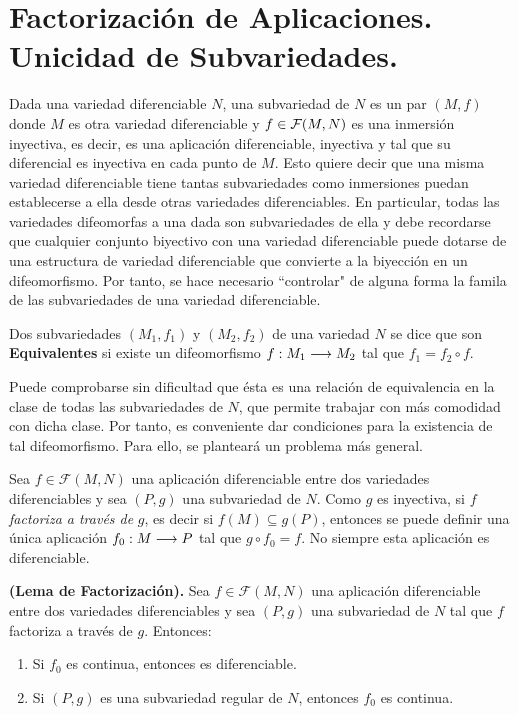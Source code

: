 \documentclass[Cursovd_portada.tex]{subfiles}
\begin{document}
\section{Factorización de Aplicaciones. Unicidad de Subvariedades.}
\hs Dada una variedad diferenciable $N$, una subvariedad de $N$ es un par $(M,f)$ donde $M$ es otra variedad
diferenciable y $f\in{\cal F}(M,N)$ es una inmersión inyectiva, es decir, es una aplicación diferenciable,
inyectiva y tal que su diferencial es inyectiva en cada punto de $M$. Esto quiere decir que una misma variedad
diferenciable tiene tantas subvariedades como inmersiones puedan establecerse a ella desde otras variedades
diferenciables. En particular, todas las variedades difeomorfas a una dada son subvariedades de ella y debe
recordarse que cualquier conjunto biyectivo con una variedad diferenciable puede dotarse de una estructura de
variedad diferenciable que convierte a la biyección en un difeomorfismo. Por tanto, se hace necesario ``controlar"
de alguna forma la famila de las subvariedades de una variedad diferenciable.
\begin{defi}
Dos subvariedades $(M_1,f_1)$ y $(M_2,f_2)$ de una variedad $N$ se
dice que son {\bf Equivalentes} si existe un difeomorfismo
$f:M_1\longrightarrow M_2$ tal que $f_1=f_2\circ f$.
\end{defi}
\hs Puede comprobarse sin dificultad que ésta es una
relación de equivalencia en la clase de todas las
subvariedades de $N$, que permite trabajar con más comodidad
con dicha clase. Por tanto, es conveniente dar condiciones para la
existencia de tal difeomorfismo. Para ello, se planteará un
problema más general.

Sea $f\in\mathcal{F}(M,N)$ una aplicación diferenciable entre
dos variedades diferenciables y sea $(P,g)$ una subvariedad de
$N$. Como $g$ es inyectiva, si $f$ {\it factoriza a través de}
$g$, es decir si $f(M)\subseteq g(P)$, entonces se puede definir
una única aplicación $f_0:M\longrightarrow P$ tal que $g\circ f_0=f$.
No siempre esta aplicación es diferenciable.
\begin{teorema}
{\bf (Lema de Factorización).} Sea $f\in\mathcal{F}(M,N)$ una
aplicación diferenciable entre dos variedades diferenciables y
sea $(P,g)$ una subvariedad de $N$ tal que $f$ factoriza a
través de $g$. Entonces:
\begin{enumerate}
\item Si $f_0$ es continua, entonces es diferenciable. \item Si
$(P,g)$ es una subvariedad regular de $N$, entonces $f_0$ es
continua.
\end{enumerate}
\end{teorema}
\end{document}
